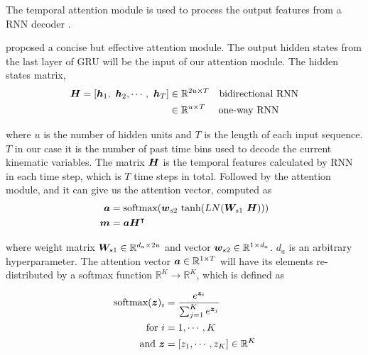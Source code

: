 
The temporal attention module is used to process the output features from a RNN decoder \citep{zhang2020motor, hu2018novel}.

\cite{tao2018get} proposed a concise but effective attention module.
The output hidden states from the last layer of GRU will be the input of our attention module.
The hidden states matrix,
\begin{align}
    \label{eq:hidden_states_dimensions}
    \begin{split}
        {\boldsymbol{H}} = [ {\boldsymbol{h}}_1, \ {\boldsymbol{h}}_2, \cdots , \  {\boldsymbol{h}}_T ] &\in \mathbb{R}^{2u \times T }  \quad  \text{bidirectional RNN}  \\
                                                    &\in \mathbb{R}^{u \times T}    \quad \ \text{one-way RNN}
    \end{split}
\end{align}

\noindent where $u$ is the number of hidden units and $ T $ is the length of each input sequence.
$T$ in our case it is the number of past time bins used to decode the current kinematic variables.
The matrix ${\boldsymbol{H}}$ is the temporal features calculated by RNN in each time step, which is $T$ time steps in total.
Followed by the attention module, and it can give us the attention vector, computed as
\begin{align}
    \label{eq:attention_vector_calculation}
    \begin{split}
        {\boldsymbol{a}} &= \text{softmax}( {\boldsymbol{w}}_{s2} \ \text{tanh} ( LN( {\boldsymbol{W}}_{s1} \ {\boldsymbol{H}} ) ) )  \\
        {\boldsymbol{m}} &= {\boldsymbol{a}} {\boldsymbol{H}}^{\intercal}
    \end{split}
\end{align}

\noindent where weight matrix ${\boldsymbol{W}}_{s1} \in \mathbb{R}^{d_a \times 2u} $ and vector ${\boldsymbol{w}}_{s2}  \in \mathbb{R}^{ 1 \times d_a }$.
$d_a$ is an arbitrary hyperparameter.
The attention vector $ {\boldsymbol{a}}  \in \mathbb{R}^{ 1 \times T } $ will have its elements re-distributed by a softmax function $\mathbb{R}^K \rightarrow \mathbb{R}^K$,
which is defined as

\begin{align}
    \begin{split}
    \text{softmax}( {\boldsymbol{z}} )_i &= \frac{ e^{ {\boldsymbol{z}}_i } }{ \sum^{K}_{j=1} e^{ {\boldsymbol{z}}_j } } \\ 
    \text{for} \ i &=1, \cdots , K \\ 
    \text{and} \ {\boldsymbol{z}}&= \left[ z_1, \cdots, z_K \right ] \in \mathbb{R}^K
    \end{split}
\end{align}

